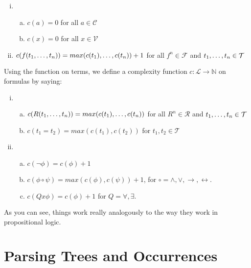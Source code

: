 \begin{enumerate}[\thesection.1]
\begin{enumerate}[(i)]
		\item \begin{enumerate}[(a)]

			\item $c(a)=0$ for all $a\in\mathcal{C}$
			
			\item $c(x)=0$ for all $x\in \mathcal{V}$
	
			\end{enumerate}
			
		\item $c(f(t_1, \mathellipsis, t_n))=max(c(t_1), \mathellipsis, c(t_n))+1$ for all $f^{n}\in\mathcal{F}$ and $t_{1}, \mathellipsis, t_{n}\in\mathcal{T}$
	
	\end{enumerate}
Using the function on terms, we define a complexity function $c:\mathcal{L}\to\mathbb{N}$ on formulas by saying:
		\begin{enumerate}[(i)]
		
			\item  \begin{enumerate}[(a)]
			
				\item $c(R(t_1,\mathellipsis, t_n))=max(c(t_1), \mathellipsis, c(t_n))$ for all $R^{n}\in\mathcal{R}$ and $t_{1}, \mathellipsis, t_{n}\in\mathcal{T}$
				
				\item $c(t_1=t_2)=max(c(t_1), c(t_2))$ for $t_{1},t_{2}\in \mathcal{T}$
			\end{enumerate}

			
			\item \begin{enumerate}[(a)]
			
			\item $c(\neg\phi)=c(\phi)+1$
			\item $c(\phi\circ\psi)=max(c(\phi),c(\psi))+1$, for $\circ=\land,\lor,\to,\leftrightarrow$.
			
			\item $c(Qx\phi)=c(\phi)+1$ for $Q=\forall,\exists$.

		
		\end{enumerate}
		\end{enumerate}
		As you can see, things work really analogously to the way they work in propositional logic.

	\end{enumerate}

\section{Parsing Trees and Occurrences}

